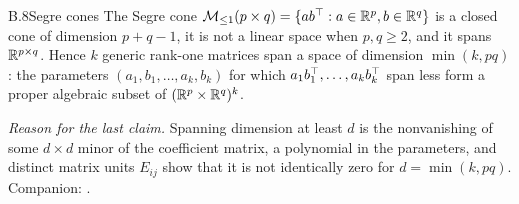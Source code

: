 \begin{auxresult}{B.8}{Segre cones}{\citep[Lecture~2]{xharris1992algebraic}}
The Segre cone $\mathcal{M}_{\le1}(p\times q)=\{ab^{\top}:a\in\mathbb{R}^p,b\in\mathbb{R}^q\}$ is a closed cone of dimension $p+q-1$, it is not a
linear space when $p,q\ge2$, and it spans $\mathbb{R}^{p\times q}$. Hence $k$ generic rank-one matrices span a space of
dimension $\min(k,pq)$: the parameters $(a_1,b_1,\dots,a_k,b_k)$ for which $a_1b_1^{\top},\dots,a_kb_k^{\top}$ span less form a
proper algebraic subset of $(\mathbb{R}^p\times\mathbb{R}^q)^k$.
\end{auxresult}
\noindent\emph{Reason for the last claim.} Spanning dimension at least $d$ is the nonvanishing of some $d\times d$
minor of the coefficient matrix, a polynomial in the parameters, and distinct matrix units $E_{ij}$ show that it is not
identically zero for $d=\min(k,pq)$. Companion: .

